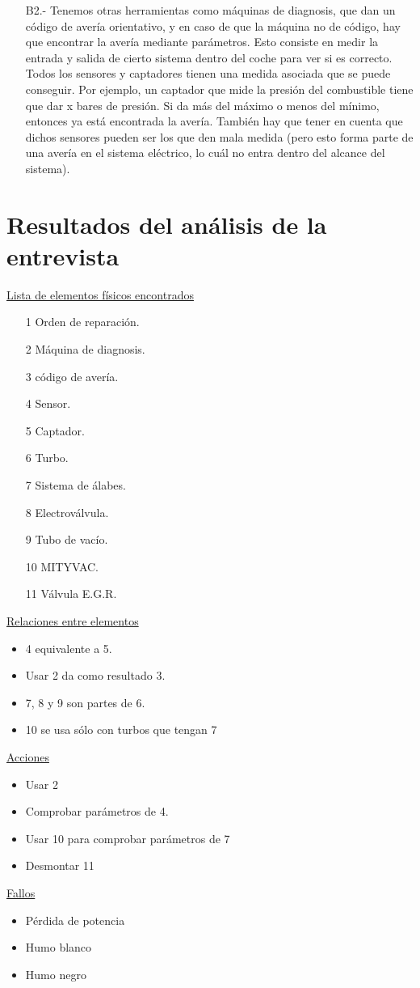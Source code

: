 \documentclass[a4paper,12pt]{article}
\begin{document}
\begin{itemize}
\begin{itemize}
 \item[B2.-] Tenemos otras herramientas como máquinas de diagnosis, que dan un código de avería orientativo, y en caso de que la máquina no de código, hay que encontrar la avería mediante parámetros. Esto consiste en medir la entrada y salida de cierto sistema dentro del coche para ver si es correcto. Todos los sensores y captadores tienen una medida asociada que se puede conseguir. Por ejemplo, un captador que mide la presión del combustible tiene que dar x bares de presión. Si da más del máximo o menos del mínimo, entonces ya está encontrada la avería. También hay que tener en cuenta que dichos sensores pueden ser los que den mala medida (pero esto forma parte de una avería en el sistema eléctrico, lo cuál no entra dentro del alcance del sistema).
 \end{itemize}
\end{itemize}  

\section{Resultados del análisis de la entrevista}
\underline{Lista de elementos físicos encontrados}
\begin{itemize}
\item[1] Orden de reparación.
\item[2] Máquina de diagnosis.
\item[3] código de avería.
\item[4] Sensor.
\item[5] Captador.
\item[6] Turbo.
\item[7] Sistema de álabes.
\item[8] Electroválvula.
\item[9] Tubo de vacío.
\item[10] MITYVAC.
\item[11] Válvula E.G.R.
\end{itemize}

\underline{Relaciones entre elementos}
\begin{itemize}
\item 4 equivalente a 5.
\item Usar 2 da como resultado 3.
\item 7, 8 y 9 son partes de 6.
\item 10 se usa sólo con turbos que tengan 7
\end{itemize}

\underline{Acciones}
\begin{itemize}
\item Usar 2
\item Comprobar parámetros de 4.
\item Usar 10 para comprobar parámetros de 7
\item Desmontar 11
\end{itemize}

\underline{Fallos}
\begin{itemize}
\item Pérdida de potencia
\item Humo blanco
\item Humo negro
\end{itemize}
\end{document}

